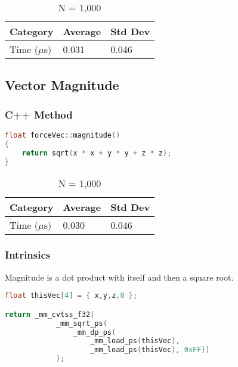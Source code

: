 \documentclass{article}
\begin{document}
\vspace{3mm}

\begin{table}[ht!]
\centering
\begin{tabular}{l|l|l}
Category        &   Average &   Std Dev \\
\hline
Time ($\mu$s)    &   0.031   &   0.046   \\
\end{tabular}
\caption{N = 1,000}
\end{table}

\subsection{Vector Magnitude}

\subsubsection{C++ Method}

\begin{lstlisting}[language=C++]
float forceVec::magnitude()
{
	return sqrt(x * x + y * y + z * z);
}
\end{lstlisting}

\vspace{3mm}

\begin{table}[ht!]
\centering
\begin{tabular}{l|l|l}
Category        &   Average &   Std Dev \\
\hline
Time ($\mu$s)    &   0.030   &   0.046   \\
\end{tabular}
\caption{N = 1,000}
\end{table}

\vspace{5mm}

\subsubsection{Intrinsics}

Magnitude is a dot product with itself and then a square root.

\begin{lstlisting}[language=C++]
float thisVec[4] = { x,y,z,0 };

return _mm_cvtss_f32(
	    	_mm_sqrt_ps(
		    	_mm_dp_ps(
			    	_mm_load_ps(thisVec), 
				    _mm_load_ps(thisVec), 0xFF))
		    );
\end{lstlisting}
\end{document}
